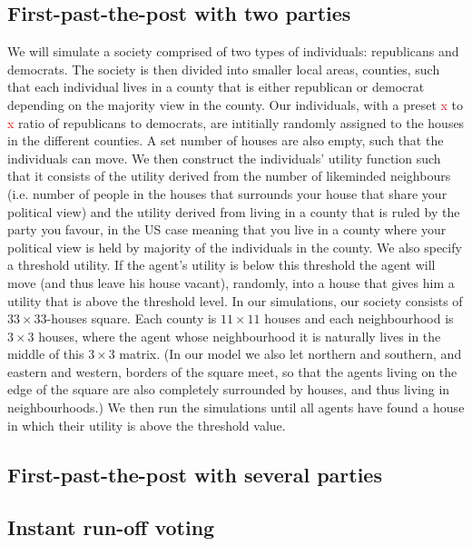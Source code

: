 \documentclass[12pt, a4paper]{article}
\begin{document}
\subsection{First-past-the-post with two parties}
We will simulate a society comprised of two types of individuals: republicans and democrats. The society is then divided into smaller local areas, counties, such that each individual lives in a county that is either republican or democrat depending on the majority view in the county. Our individuals, with a preset \textcolor{red}{x} to \textcolor{red}{x} ratio of republicans to democrats, are intitially randomly assigned to the houses in the different counties. A set number of houses are also empty, such that the individuals can move. We then construct the individuals' utility function such that it consists of the utility derived from the number of likeminded neighbours (i.e. number of people in the houses that surrounds your house that share your political view) and the utility derived from living in a county that is ruled by the party you favour, in the US case meaning that you live in a county where your political view is held by majority of the individuals in the county. We also specify a threshold utility. If the agent's utility is below this threshold the agent will move (and thus leave his house vacant), randomly, into a house that gives him a utility that is above the threshold level. In our simulations, our society consists of $33\times33$-houses square. Each county is $11\times11$ houses and each neighbourhood is $3\times3$ houses, where the agent whose neighbourhood it is naturally lives in the middle of this $3\times3$ matrix. (In our model we also let northern and southern, and eastern and western, borders of the square meet, so that the agents living on the edge of the square are also completely surrounded by houses, and thus living in neighbourhoods.) We then run the simulations until all agents have found a house in which their utility is above the threshold value.

\subsection{First-past-the-post with several parties}
\subsection{Instant run-off voting} 

\end{document}
